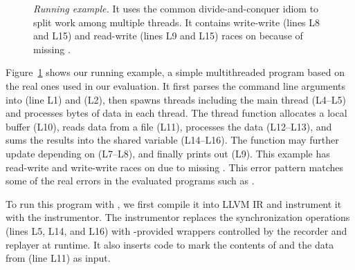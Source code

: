 \begin{figure}[!ht]
\centering
\begin{minipage}{.5\textwidth}
\tiny {}
\end{minipage}
\caption{{\em Running example.} It uses the common
  divide-and-conquer idiom to split work among multiple threads.
  It contains write-write (lines L8 and L15)
  and read-write (lines L9 and L15) races on  because
  of missing .} \label{fig:peregrine-example}
\end{figure}

Figure~\ref{fig:peregrine-example} shows our running example, a simple multithreaded
program based on the real ones used in our evaluation.  It first parses
the command line arguments into  (line L1) and  (L2),
then spawns  threads including the main thread (L4--L5) and
processes  bytes of data in each thread.  The thread
function  allocates a local buffer (L10), reads data from a
file (L11), processes the data (L12--L13), and sums the results into
the shared variable  (L14--L16).  The  function may
further update  depending on  (L7--L8), and finally
prints out  (L9).  This example has read-write and write-write
races on  due to missing .  This error
pattern matches some of the real errors in the evaluated programs such as
\pbzip.

 To run this
program with \peregrine, we first compile it into LLVM IR and instrument it with
the instrumentor.  The instrumentor replaces the synchronization
operations (lines L5, L14, and L16) with \peregrine-provided wrappers controlled by
the recorder and replayer at runtime.  It also inserts code to mark 
the contents of  and the data from  (line L11) as
input.

